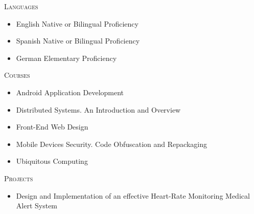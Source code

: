 \documentclass[11pt]{article}
\let\oldbibentry\bibentry
\renewcommand{\bibentry}[1]{\oldbibentry{#1}.}
\renewcommand{\section}[1]
{\vspace{1.0\baselineskip}{\Large\textbf{#1}}}
\begin{document}



\section{Skills}

\textsc{Languages}
\begin{itemize}
    \item[] English \hfill Native or Bilingual Proficiency
    \item[] Spanish \hfill Native or Bilingual Proficiency
    \item[] German \hfill Elementary Proficiency
\end{itemize}

\textsc{Courses}
\begin{itemize}
    \item[] Android Application Development
    \item[] Distributed Systems. An Introduction and Overview
    \item[] Front-End Web Design
    \item[] Mobile Devices Security. Code Obfuscation and Repackaging
    \item[] Ubiquitous Computing
\end{itemize}



\textsc{Projects}
\begin{itemize}
    \item[] Design and Implementation of an effective Heart-Rate Monitoring Medical Alert System
\end{itemize}


\end{document}
